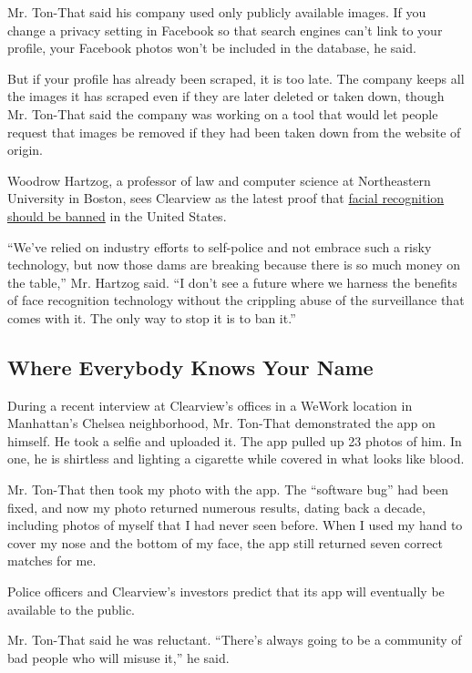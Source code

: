 Mr. Ton-That said his company used only publicly available images. If
you change a privacy setting in Facebook so that search engines can't
link to your profile, your Facebook photos won't be included in the
database, he said.

But if your profile has already been scraped, it is too late. The
company keeps all the images it has scraped even if they are later
deleted or taken down, though Mr. Ton-That said the company was working
on a tool that would let people request that images be removed if they
had been taken down from the website of origin.

Woodrow Hartzog, a professor of law and computer science at Northeastern
University in Boston, sees Clearview as the latest proof that
\href{https://www.nytimes3xbfgragh.onion/2019/10/17/opinion/facial-recognition-ban.html}{facial
recognition should be banned} in the United States.

``We've relied on industry efforts to self-police and not embrace such a
risky technology, but now those dams are breaking because there is so
much money on the table,'' Mr. Hartzog said. ``I don't see a future
where we harness the benefits of face recognition technology without the
crippling abuse of the surveillance that comes with it. The only way to
stop it is to ban it.''

\hypertarget{where-everybody-knows-your-name}{%
\subsection{Where Everybody Knows Your
Name}\label{where-everybody-knows-your-name}}

During a recent interview at Clearview's offices in a WeWork location in
Manhattan's Chelsea neighborhood, Mr. Ton-That demonstrated the app on
himself. He took a selfie and uploaded it. The app pulled up 23 photos
of him. In one, he is shirtless and lighting a cigarette while covered
in what looks like blood.

Mr. Ton-That then took my photo with the app. The ``software bug'' had
been fixed, and now my photo returned numerous results, dating back a
decade, including photos of myself that I had never seen before. When I
used my hand to cover my nose and the bottom of my face, the app still
returned seven correct matches for me.

Police officers and Clearview's investors predict that its app will
eventually be available to the public.

Mr. Ton-That said he was reluctant. ``There's always going to be a
community of bad people who will misuse it,'' he said.

